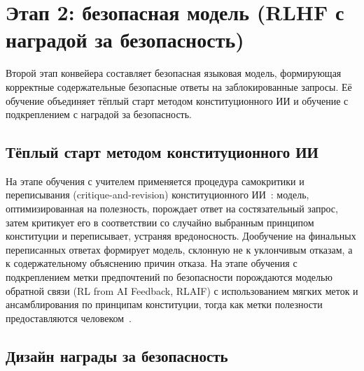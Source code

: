 \section{Этап 2: безопасная модель (RLHF с наградой за безопасность)}\label{sec:sp_stage2}

Второй этап конвейера составляет безопасная языковая модель, формирующая корректные содержательные безопасные ответы на заблокированные запросы.
Её обучение объединяет тёплый старт методом конституционного ИИ и обучение с подкреплением с наградой за безопасность.

\subsection{Тёплый старт методом конституционного ИИ}\label{subsec:sp_cai}

На этапе обучения с учителем применяется процедура самокритики и переписывания (critique-and-revision) конституционного ИИ~\cite{bai2022cai}: модель, оптимизированная на полезность, порождает ответ на состязательный запрос, затем критикует его в соответствии со случайно выбранным принципом конституции и переписывает, устраняя вредоносность.
Дообучение на финальных переписанных ответах формирует модель, склонную не к уклончивым отказам, а к содержательному объяснению причин отказа.
На этапе обучения с подкреплением метки предпочтений по безопасности порождаются моделью обратной связи (RL from AI Feedback, RLAIF) с использованием мягких меток и ансамблирования по принципам конституции, тогда как метки полезности предоставляются человеком~\cite{bai2022cai,bai2022hhrlhf}.

\subsection{Дизайн награды за безопасность}\label{subsec:sp_reward}

